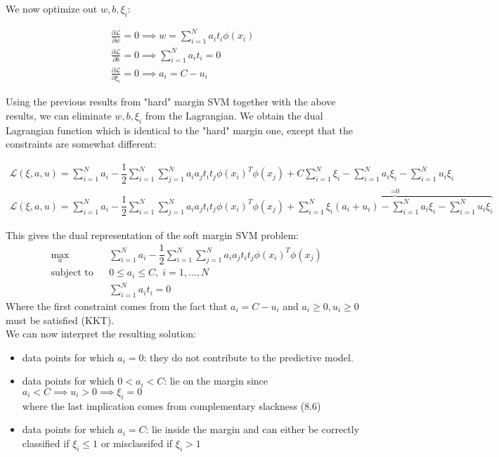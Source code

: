 \documentclass[twoside]{article}
\begin{document}
We now optimize out $w,b,\xi_{i}$:

\begin{align*}
        \frac{\partial{\mathcal{L}}}{\partial{w}} = 0 \implies w = \sum_{i=1}^{N} a_{i}t_{i}\phi(x_{i}) \\       \frac{\partial{\mathcal{L}}}{\partial{b}} = 0 \implies \sum_{i=1}^{N} a_{i}t_{i} = 0 \\
        \frac{\partial{\mathcal{L}}}{\partial{\xi_{i}}} = 0 \implies 
        a_{i} = C - u_{i}
\end{align*}

Using the previous results from "hard" margin SVM together with the above  results, we can  eliminate $w,b,\xi_{i}$ from the Lagrangian. We obtain the dual Lagrangian function which is identical to the "hard" margin one, except that the constraints are somewhat different:


\begin{align*}
         \mathcal{L}(\xi,a,u) = \sum_{i=1}^{N} a_{i}  - \dfrac{1}{2}
    \sum_{i=1}^{N} { \sum_{j=1}^{N} a_{i} a_{j} t_{i} t_{j} \phi(x_{i})^T \phi(x_{j})} + C \sum_{i=1}^{N} \xi_{i} - \sum_{i=1}^{N} a_{i} \xi_{i} -
         \sum_{i=1}^{N} u_{i} \xi_{i} \\       
          \mathcal{L}(\xi,a,u) = \sum_{i=1}^{N} a_{i}  - \dfrac{1}{2}
    \sum_{i=1}^{N} { \sum_{j=1}^{N} a_{i} a_{j} t_{i} t_{j} \phi(x_{i})^T \phi(x_{j})} +  \overbrace{\sum_{i=1}^{N} \xi_{i} (a_{i} + u_{i}) - \sum_{i=1}^{N} a_{i} \xi_{i} -
         \sum_{i=1}^{N} u_{i} \xi_{i}}^\text{=0} 
        \end{align*}

This gives the dual representation of the soft margin SVM problem:
\begin{equation*}
\begin{aligned}
& \underset{a}{\text{max}}
& & \sum_{i=1}^{N} a_{i}  - \dfrac{1}{2}
    \sum_{i=1}^{N} { \sum_{j=1}^{N} a_{i} a_{j} t_{i} t_{j} \phi(x_{i})^T \phi(x_{j})}\\
& \text{subject to}
& & 0 \leq a_{i} \leq C  , \; i = 1, \ldots, N \\
&&& \sum_{i=1}^{N} a_{i}t_{i} = 0
\end{aligned}
\end{equation*}
Where the first constraint comes from the fact that $a_{i} = C - u_{i}$ and $a_{i} \geq 0, u_{i} \geq 0$ must be satisfied (KKT).
\\

We can now interpret the resulting solution:
\begin{itemize}
    \item data points for which $a_{i} = 0$: they do not contribute to the predictive model.
    \item data points for which $0 < a_{i} < C$: lie on the margin since $a_{i} < C \implies u_{i} > 0 \implies \xi_{i} = 0$  \\ where the last implication comes from complementary slackness (8.6)
    \item data points for which $a_{i} = C$: lie inside the margin and can either be correctly classified if $\xi_{i} \leq 1$ or misclassifed if $\xi_{i} > 1$
\end{itemize}
\newpage
\end{document}
